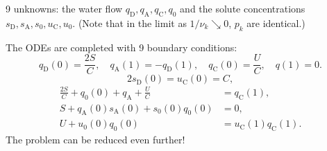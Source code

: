 \documentclass{beamer}
\begin{document}
\begin{frame}
    9 unknowns: the water flow $q_\mathrm{D},q_\mathrm{A},q_\mathrm{C},q_0$ and the solute concentrations $s_\mathrm{D},s_\mathrm{A},s_0,u_\mathrm{C},u_0$. (Note that in the limit as $1/\nu_k\searrow 0$, $p_k$ are identical.)

    The ODEs are completed with 9 boundary conditions:
    \begin{equation}\label{eq:q_bdry}
        q_\mathrm{D}(0) = \frac{2S}{C},\quad q_\mathrm{A}(1) = -q_\mathrm{D}(1),\quad q_\mathrm{C}(0) = \frac{U}{C},\quad q(1) = 0.
    \end{equation}
    \begin{equation}\label{eq:solute_bdry}
        2s_\mathrm{D}(0) = u_\mathrm{C}(0) = C,
    \end{equation}        
    \begin{align}
        \frac{2S}{C}+q_0(0)+q_\mathrm{A}+\frac{U}{C} &= q_\mathrm{C}(1),\label{eq:w_consv}\\
        S+q_\mathrm{A}(0)s_\mathrm{A}(0)+s_0(0)q_0(0) &= 0,\label{eq:s_consv}\\
        U+u_0(0)q_0(0) &= u_\mathrm{C}(1)q_\mathrm{C}(1).\label{eq:u_consv}
    \end{align}
    The problem can be reduced even further!
\end{frame}
\end{document}
